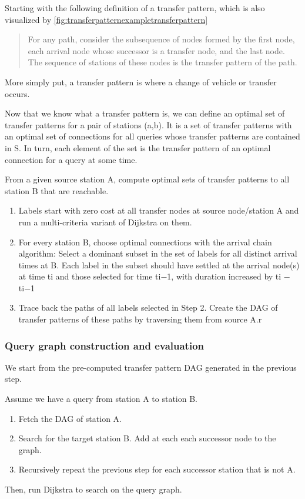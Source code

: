  Starting with the following definition\cite{bast_fast_2010} of a transfer pattern, which is also visualized by \autoref{fig:transferpatternexampletransferpattern}
\begin{quote}
    For any path, consider the subsequence of nodes formed by the first node, each arrival node whose successor is a transfer node, and the last node. The sequence of stations of these nodes is the transfer pattern of the path.
\end{quote}

More simply put, a transfer pattern is where a change of vehicle or transfer occurs. 

Now that we know what a transfer pattern is, we can define an optimal set of transfer patterns for a pair of stations (a,b). It is a set of transfer patterns with an optimal set of connections for all queries whose transfer patterns are contained in S. In turn, each element of the set is the transfer pattern of an optimal connection for a query at some time. 

From a given source station A, compute optimal sets of transfer patterns to all station B that are reachable. 
\begin{enumerate}
    \item Labels start with zero cost at all transfer nodes at source node/station A and run a multi-criteria variant of Dijkstra on them.
    \item For every station B, choose optimal connections with the arrival chain algorithm: Select a dominant subset in the set of labels for all distinct arrival times at B. Each label in the subset should have settled at the arrival node(s) at time ti and those selected for time ti−1, with duration increased by ti − ti−1
    \item Trace back the paths of all labels selected in Step 2. Create the DAG of transfer patterns of these paths by traversing them from source A.r
\end{enumerate}
\subsubsection{Query graph construction and evaluation}
We start from the pre-computed transfer pattern DAG generated in the previous step.

Assume we have a query from station A to station B.
\begin{enumerate}
    \item Fetch the DAG of station A.
    \item Search for the target station B. Add at each each successor node to the graph.
    \item Recursively repeat the previous step for each successor station that is not A.
\end{enumerate}
Then, run Dijkstra to search on the query graph.

